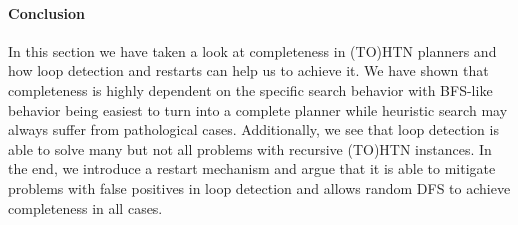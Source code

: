 \paragraph{Conclusion}
In this section we have taken a look at completeness in (TO)HTN planners and how loop detection and restarts can help us to achieve it. We have shown that completeness is highly dependent on the specific search behavior with BFS-like behavior being easiest to turn into a complete planner while heuristic search may always suffer from pathological cases. Additionally, we see that loop detection is able to solve many but not all problems with recursive (TO)HTN instances. In the end, we introduce a restart mechanism and argue that it is able to mitigate problems with false positives in loop detection and allows random DFS to achieve completeness in all cases.

